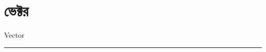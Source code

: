 \documentclass[a4paper,12pt,twoside]{book}
\begin{document}
	\chapter{ভেক্টর}
	{\Large Vector}\\
	\rule{\textwidth}{2pt}
	
\end{document}
